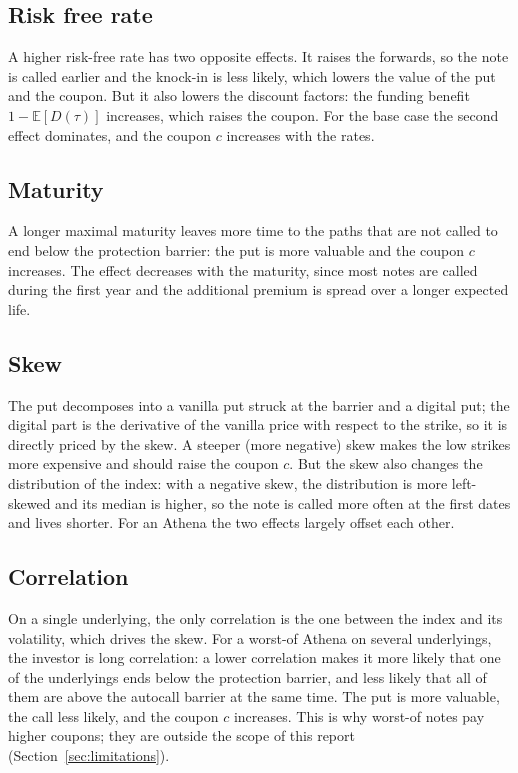 \documentclass[11pt,a4paper]{article}
\newcommand{\E}{\mathbb{E}}
\begin{document}
\subsection*{Risk free rate}

A higher risk-free rate has two opposite effects. It raises the forwards, so the note is called earlier and the
knock-in is less likely, which lowers the value of the put and the coupon. But it also lowers the discount factors:
the funding benefit $1 - \E[D(\tau)]$ increases, which raises the coupon. For the base case the second effect
dominates, and the coupon $c$ increases with the rates.


\subsection*{Maturity}

A longer maximal maturity leaves more time to the paths that are not called to end below the protection barrier: the
put is more valuable and the coupon $c$ increases. The effect decreases with the maturity, since most notes are called
during the first year and the additional premium is spread over a longer expected life.


\subsection*{Skew}

The put decomposes into a vanilla put struck at the barrier and a digital put; the digital part is the derivative of
the vanilla price with respect to the strike, so it is directly priced by the skew. A steeper (more negative) skew
makes the low strikes more expensive and should raise the coupon $c$. But the skew also changes the distribution of
the index: with a negative skew, the distribution is more left-skewed and its median is higher, so the note is called
more often at the first dates and lives shorter. For an Athena the two effects largely offset each other.


\subsection*{Correlation}

On a single underlying, the only correlation is the one between the index and its volatility, which drives the skew.
For a worst-of Athena on several underlyings, the investor is long correlation: a lower correlation makes it more
likely that one of the underlyings ends below the protection barrier, and less likely that all of them are above the
autocall barrier at the same time. The put is more valuable, the call less likely, and the coupon $c$ increases. This
is why worst-of notes pay higher coupons; they are outside the scope of this report
(Section~\ref{sec:limitations}).
\end{document}
